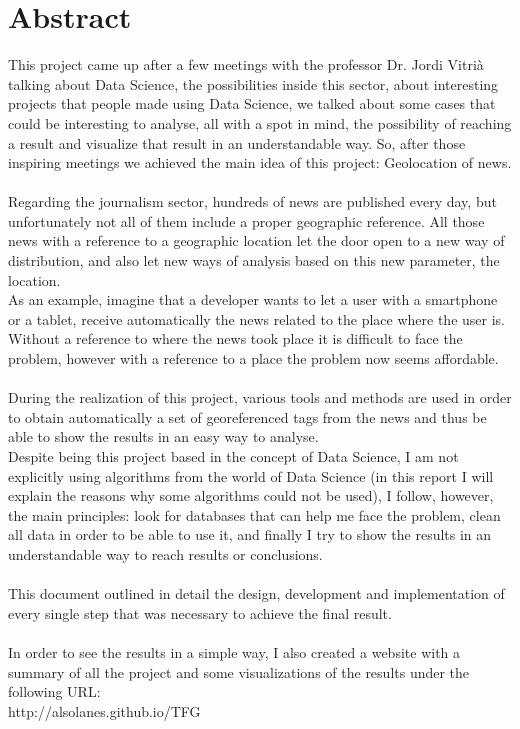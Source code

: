 \documentclass[12pt,a4paper,openright,oneside]{article}
\numberwithin{equation}{section}
\theoremstyle{definition}
\begin{document}
\newpage
{} 

\section*{Abstract} 
This project came up after a few meetings with the professor Dr. Jordi Vitrià talking about Data Science, the possibilities inside this sector, about interesting projects that people made using Data Science, we talked about some cases that could be interesting to analyse, all with a spot in mind, the possibility of reaching a result and visualize that result in an understandable way. So, after those inspiring meetings we achieved the main idea of this project: Geolocation of news. \\ \\
Regarding the journalism sector, hundreds of news are published every day, but unfortunately not all of them include a proper geographic reference. All those news with a reference to a geographic location let the door open to a new way of distribution, and also let new ways of analysis based on this new parameter, the location. \\
As an example, imagine that a developer wants to let a user with a smartphone or a tablet, receive automatically the news related to the place where the user is. Without a reference to where the news took place it is difficult to face the problem, however with a reference to a place the problem now seems affordable.\\ \\
During the realization of this project, various tools and methods are used in order to obtain automatically a set of georeferenced tags from the news and thus be able to show the results in an easy way to analyse. \\
Despite being this project based in the concept of Data Science, I am not explicitly  using algorithms from the world of Data Science (in this report I will explain the reasons why some algorithms could not be used), I follow, however, the main principles: look for databases that can help me face the problem, clean all data in order to be able to use it, and finally I try to show the results in an understandable way to reach results or conclusions. \\ \\
This document outlined in detail the design, development and implementation of every single step that was necessary to achieve the final result.\\ \\
In order to see the results in a simple way, I also created a website with a summary of all the project and some visualizations of the results under the following URL:\\
http://alsolanes.github.io/TFG
\newpage
\end{document}
